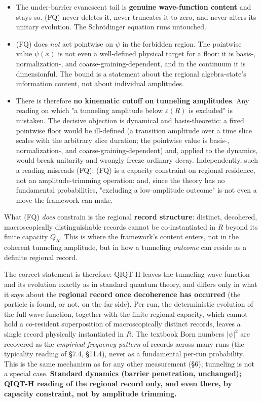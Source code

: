 \documentclass[11pt,a4paper]{article}
\begin{document}
\begin{itemize}
  \item The under-barrier evanescent tail is \textbf{genuine wave-function content} and stays so. (FQ) never deletes it, never truncates it to zero, and never alters its unitary evolution. The Schrödinger equation runs untouched.
  \item (FQ) does \emph{not} act pointwise on $\psi$ in the forbidden region. The pointwise value $\psi(x)$ is not even a well-defined physical target for a floor: it is basis-, normalization-, and coarse-graining-dependent, and in the continuum it is dimensionful. The bound is a statement about the regional algebra-state's information content, not about individual amplitudes.
  \item There is therefore \textbf{no kinematic cutoff on tunneling amplitudes}. Any reading on which "a tunneling amplitude below $\varepsilon(R)$ is excluded" is mistaken. The decisive objection is dynamical and basis-theoretic: a fixed pointwise floor would be ill-defined (a transition amplitude over a time slice scales with the arbitrary slice duration; the pointwise value is basis-, normalization-, and coarse-graining-dependent) and, applied to the dynamics, would break unitarity and wrongly freeze ordinary decay. Independently, such a reading misreads (FQ): (FQ) is a capacity constraint on regional residence, not an amplitude-trimming operation: and, since the theory has no fundamental probabilities, "excluding a low-amplitude outcome" is not even a move the framework can make.
\end{itemize}

What (FQ) \emph{does} constrain is the regional \textbf{record structure}: distinct, decohered, macroscopically distinguishable records cannot be co-instantiated in $R$ beyond its finite capacity $Q_R$. This is where the framework's content enters, not in the coherent tunneling amplitude, but in how a tunneling \emph{outcome} can reside as a definite regional record.

The correct statement is therefore: QIQT-H leaves the tunneling wave function and its evolution exactly as in standard quantum theory, and differs only in what it says about the \textbf{regional record once decoherence has occurred} (the particle is found, or not, on the far side). Per run, the deterministic evolution of the full wave function, together with the finite regional capacity, which cannot hold a co-resident superposition of macroscopically distinct records, leaves a single record physically instantiated in $R$. The textbook Born numbers $|\psi|^2$ are recovered as the \emph{empirical frequency pattern} of records across many runs (the typicality reading of §7.4, §11.4), never as a fundamental per-run probability. This is the same mechanism as for any other measurement (§6); tunneling is not a special case. \textbf{Standard dynamics (barrier penetration, unchanged); QIQT-H reading of the regional record only, and even there, by capacity constraint, not by amplitude trimming.}
\end{document}
